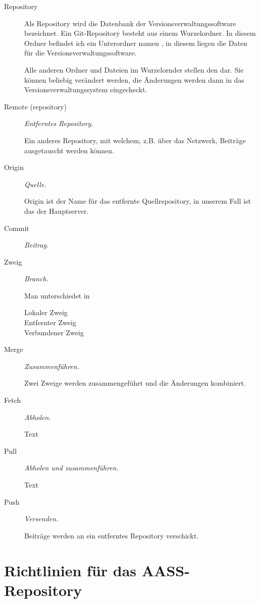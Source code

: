 \documentclass[ngerman,paper=a4,fontsize=8pt,headings=small,draft=no,parskip=half,noonelinecaption]{scrreprt}
\begin{document}
\begin{description}
    \item[Repository] \emph{} \par Als Repository wird die
    Datenbank der Versionsverwaltungssoftware bezeichnet.
    Ein Git-Repository besteht aus einem Wurzelordner. In
    diesem Ordner befindet ich ein Unterordner namen ,
    in diesem liegen die Daten für die
    Versionsverwaltungssoftware. \par Alle anderen Ordner
    und Dateien im Wurzelornder stellen den 
    dar. Sie können beliebig verändert werden, die Änderungen
    werden dann in das Versionsverwaltungssystem
    eingecheckt. 
    \item[Remote (repository)] \emph{Entferntes
    Repository.} \par Ein anderes Repository, mit welchem,
    z.B. über das Netzwerk, Beiträge ausgetauscht werden
    können.
    \item[Origin] \emph{Quelle.} \par Origin ist der Name
    für das entfernte Quellrepository, in unserem Fall ist
    das der Hauptserver.
    \item[Commit] \emph{Beitrag.} 
    \item[Zweig] \emph{Branch.} \par Man unterschiedet in
    \begin{description}
    \item[Lokaler Zweig]
    \item[Entfernter Zweig]
    \item[Verbundener Zweig]
\end{description}    
    \item[Merge]  \emph{Zusammenführen.}\par Zwei Zweige
    werden zusammengeführt und die Änderungen kombiniert.
    \item[Fetch] \emph{Abholen.} \par Text   
    \item[Pull] \emph{Abholen und zusammenführen.} \par
    Text  
    \item[Push] \emph{Versenden.} \par Beiträge werden an
    ein entferntes Repository verschickt. 
\end{description}



\section{Richtlinien für das AASS-Repository}
\end{document}
